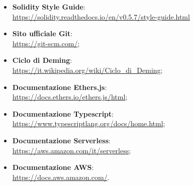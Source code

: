 \begin{itemize}
		\item \textbf{Solidity} \textbf{Style Guide}: \\
			\url{https://solidity.readthedocs.io/en/v0.5.7/style-guide.html}
	
		\item \textbf{Sito ufficiale Git}: \\
			\url{https://git-scm.com/};
		
		\item \textbf{Ciclo di Deming}: \\
			\url{https://it.wikipedia.org/wiki/Ciclo_di_Deming};
		
		\item \textbf{Documentazione Ethers.js}: \\
			\url{https://docs.ethers.io/ethers.js/html};
			
		\item \textbf{Documentazione Typescript}: \\
			\url{https://www.typescriptlang.org/docs/home.html};
			
		\item \textbf{Documentazione Serverless}: \\
			\url{https://aws.amazon.com/it/serverless};
		
		\item \textbf{Documentazione AWS}: \\
			\url{https://docs.aws.amazon.com/}.
			
		
	\end{itemize}